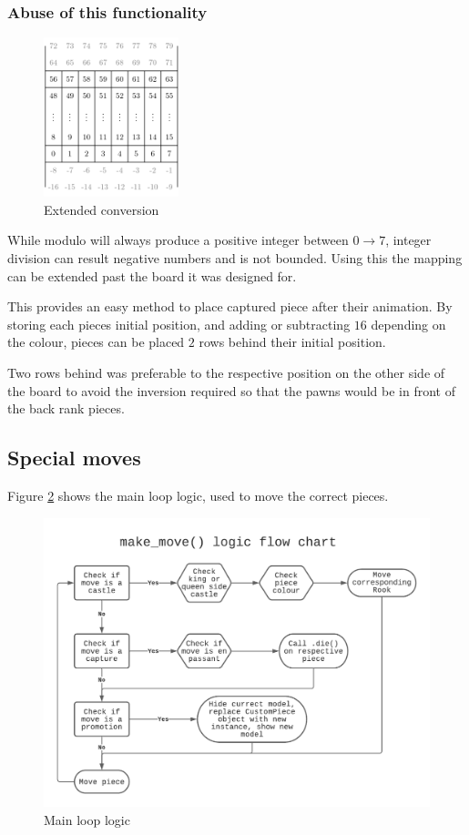 \documentclass[11pt]{article}
\begin{document}
\subsubsection{Abuse of this functionality}
\label{sec:orgfb57a96}
\begin{figure}
\centering
\includegraphics[width=0.35\textwidth]{Images/tikzit_image0.png}
\caption{\label{extended-array}Extended conversion}
\end{figure}

While modulo will always produce a positive integer between \(0 \to 7\), integer
division can result negative numbers and is not bounded. Using this the mapping
can be extended past the board it was designed for.

This provides an easy method to place captured piece after their animation. By
storing each pieces initial position, and adding or subtracting \(16\) depending on
the colour, pieces can be placed \(2\) rows behind their initial position.

Two rows behind was preferable to the respective position on the other side of
the board to avoid the inversion required so that the pawns would be in front of the
back rank pieces.

\newpage
\subsection{Special moves}
\label{sec:org5b009c3}
Figure \ref{flowchart} shows the main loop logic, used to move the correct pieces.
\begin{figure}[htbp]
\centering
\includegraphics[width=\textwidth]{flowchart.pdf}
\caption{\label{flowchart}Main loop logic}
\end{figure}
\end{document}
